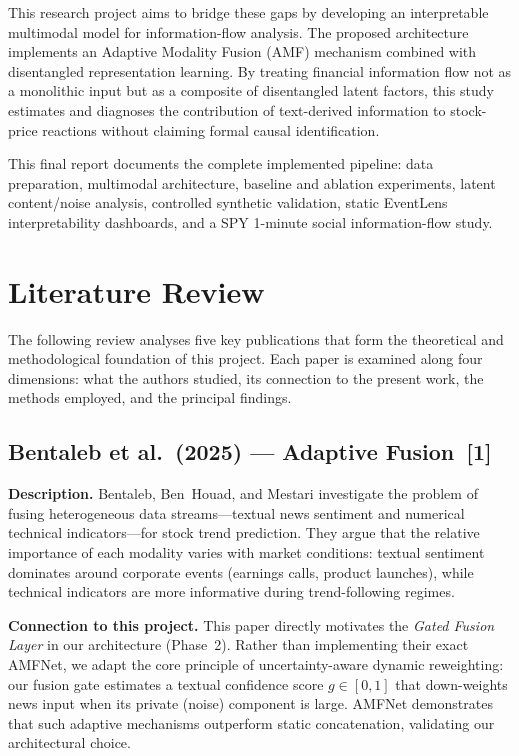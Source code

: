 \documentclass[12pt, a4paper]{article}
\begin{document}
This research project aims to bridge these gaps by developing an interpretable multimodal model for information-flow analysis. The proposed architecture implements an Adaptive Modality Fusion (AMF) mechanism combined with disentangled representation learning. By treating financial information flow not as a monolithic input but as a composite of disentangled latent factors, this study estimates and diagnoses the contribution of text-derived information to stock-price reactions without claiming formal causal identification.

This final report documents the complete implemented pipeline: data preparation, multimodal architecture, baseline and ablation experiments, latent content/noise analysis, controlled synthetic validation, static EventLens interpretability dashboards, and a SPY 1-minute social information-flow study.


\section{Literature Review}
\label{sec:litreview}

The following review analyses five key publications that form the theoretical and methodological foundation of this project. Each paper is examined along four dimensions: what the authors studied, its connection to the present work, the methods employed, and the principal findings.

\subsection{Bentaleb et al.\ (2025) --- Adaptive Fusion~[1]}

\textbf{Description.}
Bentaleb, Ben~Houad, and Mestari investigate the problem of fusing heterogeneous data streams---textual news sentiment and numerical technical indicators---for stock trend prediction. They argue that the relative importance of each modality varies with market conditions: textual sentiment dominates around corporate events (earnings calls, product launches), while technical indicators are more informative during trend-following regimes.

\textbf{Connection to this project.}
This paper directly motivates the \textit{Gated Fusion Layer} in our architecture (Phase~2). Rather than implementing their exact AMFNet, we adapt the core principle of uncertainty-aware dynamic reweighting: our fusion gate estimates a textual confidence score $g \in [0, 1]$ that down-weights news input when its private (noise) component is large. AMFNet demonstrates that such adaptive mechanisms outperform static concatenation, validating our architectural choice.
\end{document}
